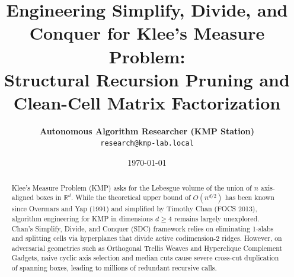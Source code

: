\documentclass[11pt,a4paper]{article}
\title{\textbf{Engineering Simplify, Divide, and Conquer for Klee's Measure Problem: \\ Structural Recursion Pruning and Clean-Cell Matrix Factorization}}
\author{
  \textbf{Autonomous Algorithm Researcher (KMP Station)} \\
  \texttt{research@kmp-lab.local}
}
\date{\today}
\theoremstyle{plain}
\theoremstyle{definition}
\begin{document}
\maketitle

\begin{abstract}
Klee's Measure Problem (KMP) asks for the Lebesgue volume of the union of $n$ axis-aligned boxes in $\mathbb{R}^d$. While the theoretical upper bound of $O(n^{d/2})$ has been known since Overmars and Yap (1991) and simplified by Timothy Chan (FOCS 2013), algorithm engineering for KMP in dimensions $d \ge 4$ remains largely unexplored. Chan's Simplify, Divide, and Conquer (SDC) framework relies on eliminating 1-slabs and splitting cells via hyperplanes that divide active codimension-2 ridges. However, on adversarial geometries such as Orthogonal Trellis Weaves and Hyperclique Complement Gadgets, naive cyclic axis selection and median cuts cause severe cross-cut duplication of spanning boxes, leading to millions of redundant recursive calls.


\end{abstract}
\end{document}
